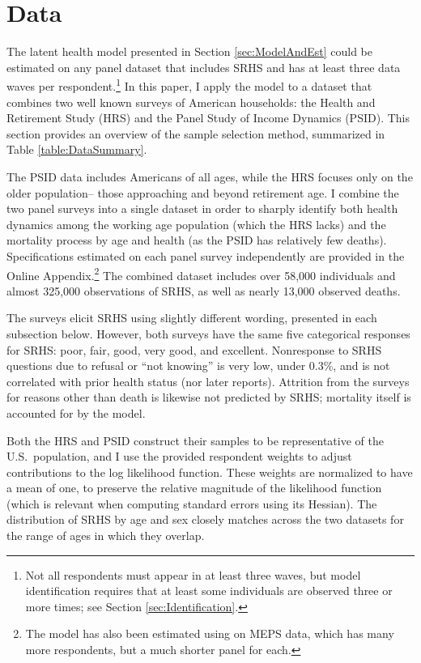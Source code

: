 \documentclass[12pt,pdftex,letterpaper]{article}
\newcommand{\RootDir}{..}
\newcommand{\TablesDir}{\RootDir/Tables}
\begin{document}
\section{Data}\label{sec:Data}

The latent health model presented in Section \ref{sec:ModelAndEst} could be estimated on any panel dataset that includes SRHS and has at least three data waves per respondent.\footnote{Not all respondents must appear in at least three waves, but model identification requires that at least some individuals are observed three or more times; see Section \ref{sec:Identification}.}  In this paper, I apply the model to a dataset that combines two well known surveys of American households: the Health and Retirement Study (HRS) and the Panel Study of Income Dynamics (PSID). This section provides an overview of the sample selection method, summarized in Table \ref{table:DataSummary}.



\vspace{-1cm}

The PSID data includes Americans of all ages, while the HRS focuses only on the older population-- those approaching and beyond retirement age. I combine the two panel surveys into a single dataset in order to sharply identify both health dynamics among the working age population (which the HRS lacks) and the mortality process by age and health (as the PSID has relatively few deaths). Specifications estimated on each panel survey independently are provided in the Online Appendix.\footnote{The model has also been estimated using on MEPS data, which has many more respondents, but a much shorter panel for each.} The combined dataset includes over 58,000 individuals and almost 325,000 observations of SRHS, as well as nearly 13,000 observed deaths.

The surveys elicit SRHS using slightly different wording, presented in each subsection below.  However, both surveys have the same five categorical responses for SRHS: poor, fair, good, very good, and excellent.  Nonresponse to SRHS questions due to refusal or ``not knowing'' is very low, under 0.3\%, and is not correlated with prior health status (nor later reports).  Attrition from the surveys for reasons other than death is likewise not predicted by SRHS; mortality itself is accounted for by the model.

Both the HRS and PSID construct their samples to be representative of the U.S.\ population, and I use the provided respondent weights to adjust contributions to the log likelihood function.  These weights are normalized to have a mean of one, to preserve the relative magnitude of the likelihood function (which is relevant when computing standard errors using its Hessian). The distribution of SRHS by age and sex closely matches across the two datasets for the range of ages in which they overlap.
\end{document}
